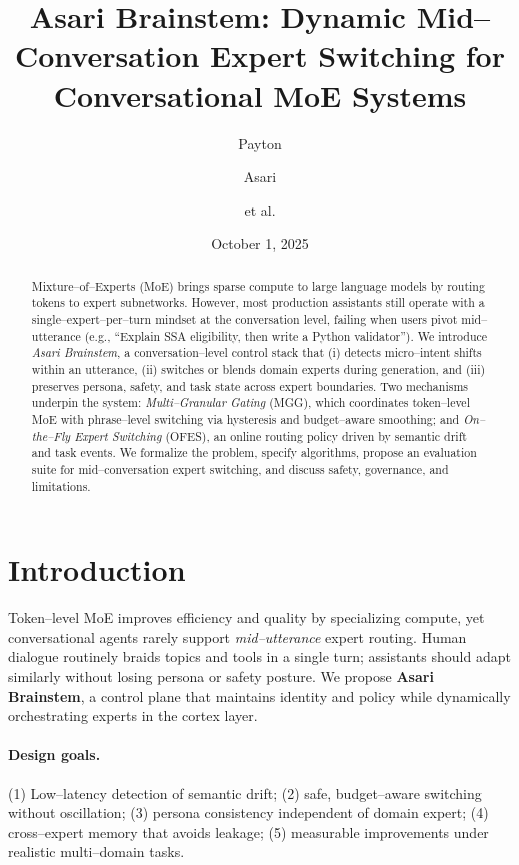 \documentclass[11pt]{article}
\title{\textbf{Asari Brainstem: Dynamic Mid--Conversation Expert Switching for Conversational MoE Systems}}
\author{Payton \and Asari \and et al.}
\date{October 1, 2025}
\begin{document}
\maketitle

\begin{abstract}
Mixture--of--Experts (MoE) brings sparse compute to large language models by routing tokens to expert subnetworks. However, most production assistants still operate with a single--expert--per--turn mindset at the conversation level, failing when users pivot mid--utterance (e.g., ``Explain SSA eligibility, then write a Python validator''). We introduce \emph{Asari Brainstem}, a conversation--level control stack that (i) detects micro--intent shifts within an utterance, (ii) switches or blends domain experts during generation, and (iii) preserves persona, safety, and task state across expert boundaries. Two mechanisms underpin the system: \emph{Multi--Granular Gating} (MGG), which coordinates token--level MoE with phrase--level switching via hysteresis and budget--aware smoothing; and \emph{On--the--Fly Expert Switching} (OFES), an online routing policy driven by semantic drift and task events. We formalize the problem, specify algorithms, propose an evaluation suite for mid--conversation expert switching, and discuss safety, governance, and limitations.
\end{abstract}

\section{Introduction}
Token--level MoE improves efficiency and quality by specializing compute, yet conversational agents rarely support \emph{mid--utterance} expert routing. Human dialogue routinely braids topics and tools in a single turn; assistants should adapt similarly without losing persona or safety posture. We propose \textbf{Asari Brainstem}, a control plane that maintains identity and policy while dynamically orchestrating experts in the cortex layer.

\paragraph{Design goals.} (1) Low--latency detection of semantic drift; (2) safe, budget--aware switching without oscillation; (3) persona consistency independent of domain expert; (4) cross--expert memory that avoids leakage; (5) measurable improvements under realistic multi--domain tasks.
\end{document}
